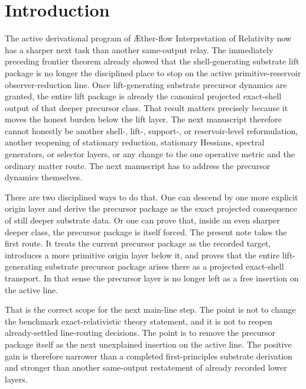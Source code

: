 \documentclass[11pt]{article}
\newcommand{\Aflow}{\AE{}ther-flow}
\newcommand{\TheoryName}{\Aflow{} Interpretation of Relativity}
\begin{document}
\section{Introduction}

The active derivational program of \TheoryName{} now has a sharper next task than another same-output relay. The immediately preceding frontier theorem already showed that the shell-generating substrate lift package is no longer the disciplined place to stop on the active primitive-reservoir observer-reduction line. Once lift-generating substrate precursor dynamics are granted, the entire lift package is already the canonical projected exact-shell output of that deeper precursor class. That result matters precisely because it moves the honest burden below the lift layer. The next manuscript therefore cannot honestly be another shell-, lift-, support-, or reservoir-level reformulation, another reopening of stationary reduction, stationary Hessians, spectral generators, or selector layers, or any change to the one operative metric and the ordinary matter route. The next manuscript has to address the precursor dynamics themselves.

There are two disciplined ways to do that. One can descend by one more explicit origin layer and derive the precursor package as the exact projected consequence of still deeper substrate data. Or one can prove that, inside an even sharper deeper class, the precursor package is itself forced. The present note takes the first route. It treats the current precursor package as the recorded target, introduces a more primitive origin layer below it, and proves that the entire lift-generating substrate precursor package arises there as a projected exact-shell transport. In that sense the precursor layer is no longer left as a free insertion on the active line.

That is the correct scope for the next main-line step. The point is not to change the benchmark exact-relativistic theory statement, and it is not to reopen already-settled line-routing decisions. The point is to remove the precursor package itself as the next unexplained insertion on the active line. The positive gain is therefore narrower than a completed first-principles substrate derivation and stronger than another same-output restatement of already recorded lower layers.
\end{document}
